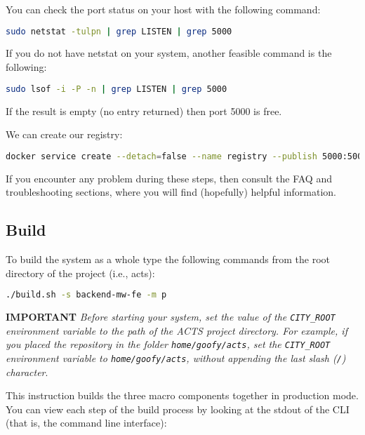 You can check the port status on your host with the following command:

\begin{lstlisting}[language=bash]
sudo netstat -tulpn | grep LISTEN | grep 5000
\end{lstlisting}

If you do not have netstat on your system, another feasible command is the
following:

\begin{lstlisting}[language=bash]
sudo lsof -i -P -n | grep LISTEN | grep 5000
\end{lstlisting}

If the result is empty (no entry returned) then port 5000 is free.

We can create our registry:

\begin{lstlisting}[language=bash]
docker service create --detach=false --name registry --publish 5000:5000 registry:latest
\end{lstlisting}

If you encounter any problem during these steps, then
consult the FAQ and troubleshooting sections, where you will find (hopefully)
helpful information.

\subsection{Build}

To build the system as a whole type the following commands from the root
directory of the project (i.e., acts):

\begin{lstlisting}[language=bash]
./build.sh -s backend-mw-fe -m p
\end{lstlisting}

\noindent\textbf{IMPORTANT} \textit{Before starting your system, set the value
of the \texttt{CITY\_ROOT} environment variable to the path of the ACTS project
directory. For example, if you placed the repository in the folder
\texttt{home/goofy/acts}, set the \texttt{CITY\_ROOT} environment variable to
\texttt{home/goofy/acts}, without appending the last slash (\texttt{/})
character}.

This instruction builds the three macro components together in production mode.
You can view each step of the build process by looking at the stdout of the CLI
(that is, the command line interface):

